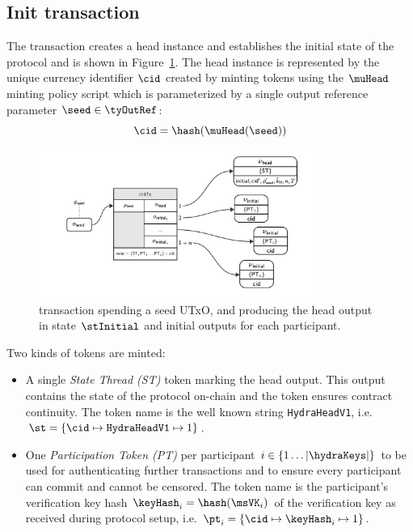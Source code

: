 \noindent {}

\subsection{Init transaction}\label{sec:init-tx}

The \mtxInit{} transaction creates a head instance and establishes the initial
state of the protocol and is shown in Figure~\ref{fig:initTx}. The head
instance is represented by the unique currency identifier $\cid$ created by
minting tokens using the $\muHead$ minting policy script which is parameterized
by a single output reference parameter $\seed \in \tyOutRef$:
\[
  \cid = \hash(\muHead(\seed))
\]

\begin{figure}
  \centering
  \includegraphics[width=0.8\textwidth]{Hydra/Protocol/Figures/initTx.pdf}
  \caption{\mtxInit{} transaction spending a seed UTxO, and producing the head
	output in state $\stInitial$ and initial outputs for each participant.}\label{fig:initTx}
\end{figure}

\noindent Two kinds of tokens are minted:
\begin{itemize}
  \item A single \emph{State Thread (ST)} token marking the head output. This
  output contains the state of the protocol on-chain and the token ensures
  contract continuity. The token name is the well known string
  \texttt{HydraHeadV1}, i.e.
  $\st = \{\cid \mapsto \texttt{HydraHeadV1} \mapsto 1\}$.
  \item One \emph{Participation Token (PT)} per participant
  $i \in \{1 \dots |\hydraKeys|  \}$ to be used for authenticating further
  transactions and to ensure every participant can commit and cannot be
  censored. The token name is the participant's verification key hash
  $\keyHash_{i} = \hash(\msVK_{i})$ of the verification key as received
  during protocol setup, i.e.
  $\pt_{i} = \{\cid \mapsto \keyHash_{i} \mapsto 1\}$.
\end{itemize}

